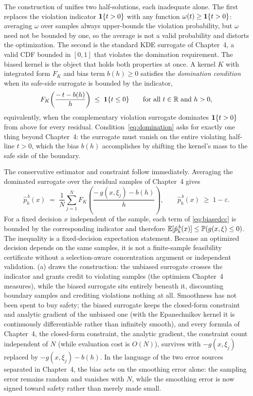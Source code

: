 The construction of \citet{keil2020} unifies two half-solutions, each
inadequate alone. The first replaces the violation indicator
${\mathbf{1}\{t > 0\}}$ with any function $\omega(t) \geq {\mathbf{1}\{t > 0\}}$: averaging
$\omega$ over samples always upper-bounds the violation probability, but $\omega$
need not be bounded by one, so the average is not a valid probability
and distorts the optimization. The second is the standard KDE surrogate
of Chapter~4, a valid CDF bounded in $[0,1]$ that violates the
domination requirement. The biased kernel is the object that holds both
properties at once. A kernel $K$ with integrated form $F_K$ and bias
term $b(h) \geq 0$ satisfies the \emph{domination condition} when its
safe-side surrogate is bounded by the indicator,
\begin{equation}
  F_K\!\left(\frac{-\,t - b(h)}{h}\right) \;\leq\; \mathbf{1}\{t \leq 0\}
  \qquad \text{for all } t \in \mathbb{R} \text{ and } h > 0 ,
  \label{eq:domination}
\end{equation}
equivalently, when the complementary violation surrogate dominates
${\mathbf{1}\{t > 0\}}$ from above for every residual. Condition~\eqref{eq:domination} asks for exactly one thing beyond Chapter~4: the
surrogate must vanish on the entire violating half-line $t > 0$, which
the bias $b(h)$ accomplishes by shifting the kernel's mass to the safe
side of the boundary.

The conservative estimator and constraint follow immediately. Averaging
the dominated surrogate over the residual samples of Chapter~4 gives
\begin{equation}
  \hat{p}_h^{\,b}(x)
  \;=\; \frac{1}{N}\sum_{j=1}^{N}
  F_K\!\left(\frac{-\,g(x,\xi_j) - b(h)}{h}\right),
  \qquad
  \hat{p}_h^{\,b}(x) \;\geq\; 1-\varepsilon .
  \label{eq:biasedcc}
\end{equation}
For a fixed decision $x$ independent of the sample, each term of
\cref{eq:biasedcc} is bounded by the corresponding indicator and therefore
$\mathbb{E}[\hat{p}_h^{\,b}(x)] \leq \mathbb{P}(g(x,\xi) \leq 0)$. The inequality is a
fixed-decision expectation statement. Because an optimized decision depends on
the same samples, it is not a finite-sample feasibility certificate without a
selection-aware concentration argument or independent validation.
(a) draws the construction: the unbiased surrogate
crosses the indicator and grants credit to violating samples (the
optimism Chapter~4 measures), while the biased surrogate sits entirely
beneath it, discounting boundary samples and crediting violations
nothing at all. Smoothness has not been spent to buy safety; the biased
surrogate keeps the closed-form constraint and analytic gradient of the
unbiased one (with the Epanechnikov kernel it is continuously
differentiable rather than infinitely smooth), and every
formula of Chapter~4, the closed-form constraint, the analytic gradient,
the constraint count independent of $N$ (while evaluation cost is $O(N)$), survives with $-g(x,\xi_j)$ replaced
by $-g(x,\xi_j) - b(h)$. In the language of the two error sources
separated in Chapter~4, the bias acts on the smoothing error alone: the
sampling error remains random and vanishes with $N$, while the
smoothing error is now signed toward safety rather than merely made
small.

